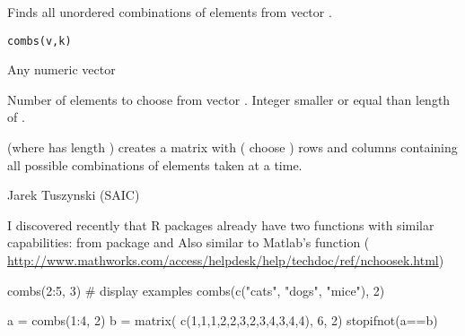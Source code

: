 \begin{Description}\relax
Finds all unordered combinations of  elements from vector 
.
\end{Description}
\begin{Usage}
\begin{verbatim}combs(v,k)\end{verbatim}
\end{Usage}
\begin{Arguments}
\begin{ldescription}
\item[\code{v}] Any numeric vector
\item[\code{k}] Number of elements to choose from vector . Integer smaller 
or equal than length of .  
\end{ldescription}
\end{Arguments}
\begin{Value}
 (where  has length ) creates a matrix with 
 ( choose ) rows
and  columns containing all possible combinations of  elements 
taken  at a time.
\end{Value}
\begin{Author}\relax
Jarek Tuszynski (SAIC) 
\end{Author}
\begin{SeeAlso}\relax
I discovered recently that R packages already have two functions with 
similar capabilities:
 from  package and
Also similar to Matlab's  function (\url{
http://www.mathworks.com/access/helpdesk/help/techdoc/ref/nchoosek.html})
\end{SeeAlso}
\begin{Examples}
\begin{ExampleCode}
  combs(2:5, 3) # display examples
  combs(c("cats", "dogs", "mice"), 2)
  
  a = combs(1:4, 2)
  b = matrix( c(1,1,1,2,2,3,2,3,4,3,4,4), 6, 2)
  stopifnot(a==b)
\end{ExampleCode}
\end{Examples}

